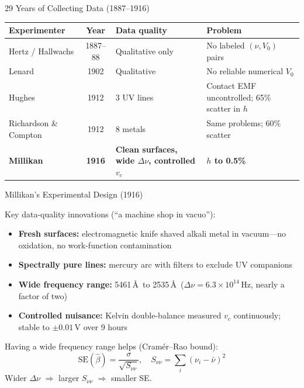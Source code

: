 \documentclass[aspectratio=169]{beamer}
\begin{document}
\begin{frame}{29 Years of Collecting  Data (1887--1916)}

\begin{center}
\small
\begin{tabular}{p{3.2cm}cp{3.5cm}p{4.3cm}}
\toprule
Experimenter & Year & Data quality & Problem \\
\midrule
Hertz / Hallwachs & 1887--88 & Qualitative only & No labeled $(\nu,V_0)$ pairs \\
Lenard            & 1902     & Qualitative       & No reliable numerical $V_0$ \\
Hughes            & 1912     & 3 UV lines        & Contact EMF uncontrolled; 65\% scatter in $h$ \\
Richardson \& Compton & 1912 & 8 metals          & Same problems; 60\% scatter \\
\midrule
\textbf{Millikan} & \textbf{1916} &
  \textbf{Clean surfaces, wide $\Delta\nu$, controlled $v_c$} &
  \textbf{$h$ to 0.5\%} \\
\bottomrule
\end{tabular}
\end{center}

\end{frame}

\begin{frame}{Millikan's Experimental Design (1916)}

Key data-quality innovations (``a machine shop in vacuo''):

\begin{itemize}
  \item \textbf{Fresh surfaces:} electromagnetic knife shaved alkali
    metal in vacuum---no oxidation, no work-function contamination
  \item \textbf{Spectrally pure lines:} mercury arc with filters to
    exclude UV companions
  \item \textbf{Wide frequency range:} 5461\,\AA\ to 2535\,\AA\
    ($\Delta\nu = 6.3\times10^{14}$\,Hz, nearly a factor of two)
  \item \textbf{Controlled nuisance:} Kelvin double-balance measured
    $v_c$ continuously; stable to $\pm 0.01$\,V over 9 hours
\end{itemize}

\medskip
Having a  wide frequency range helps (Cram\'er--Rao bound):
\[
  \mathrm{SE}(\hat\beta) = \frac{\sigma}{\sqrt{S_{\nu\nu}}},
  \quad S_{\nu\nu} = \sum_i(\nu_i - \bar\nu)^2
\]
Wider $\Delta\nu$ $\Rightarrow$ larger $S_{\nu\nu}$ $\Rightarrow$ smaller SE.

\end{frame}
\end{document}
